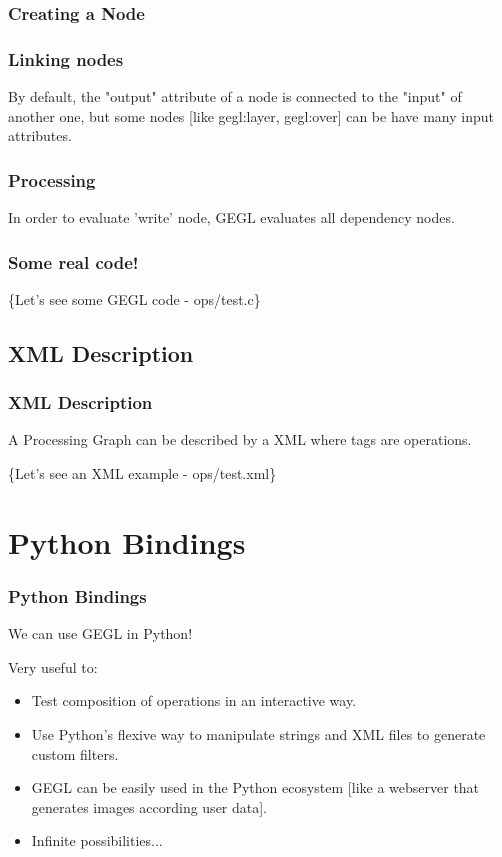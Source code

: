 \documentclass{beamer}
\begin{document}
\begin{frame}
  \frametitle{Creating a Node}
  
\end{frame}

\begin{frame}
  \frametitle{Linking nodes}
  
  
  By default, the "output" attribute of a node is connected to the
  "input" of another one, but some nodes [like gegl:layer, gegl:over]
  can be have many input attributes.
\end{frame}

\begin{frame}
  \frametitle{Processing}
  
  
  In order to evaluate 'write' node, GEGL evaluates all dependency nodes.
\end{frame}

\begin{frame}
  \frametitle{Some real code!}
  
  \{Let's see some GEGL code - ops/test.c\}
\end{frame}

\subsection{XML Description}

\begin{frame}
  \frametitle{XML Description}
  A Processing Graph can be described by a XML where tags are
  operations.
  
  \{Let's see an XML example - ops/test.xml\}
\end{frame}

\section{Python Bindings}

\begin{frame}
  \frametitle{Python Bindings}
  We can use GEGL in Python!
  
  Very useful to:
  \pause
  \begin{itemize}
    \item{Test composition of operations in an interactive way.}
    \pause
    \item{Use Python's flexive way to manipulate strings and XML files to generate custom filters.}
    \pause
    \item{GEGL can be easily used in the Python ecosystem [like a webserver that generates images according user data].}
    \pause
    \item{Infinite possibilities...}    
  \end{itemize}
\end{frame}
\end{document}
